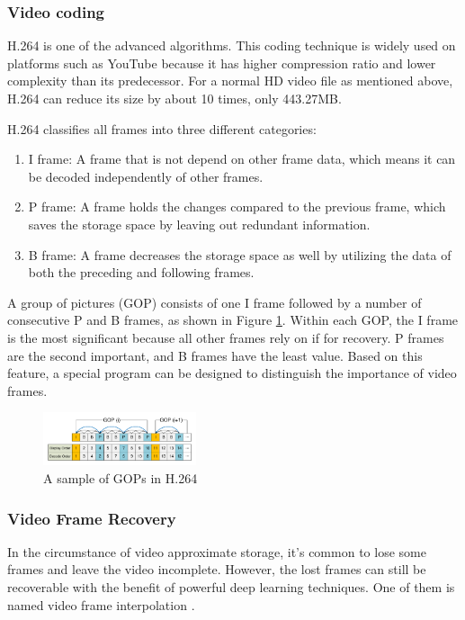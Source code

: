 \documentclass[sigconf]{acmart}
\begin{document}
\subsubsection{Video coding}
H.264 \cite{wiegand2003overview} is one of the advanced algorithms. This coding technique is widely used on platforms such as YouTube because it has higher compression ratio and lower complexity than its predecessor. For a normal HD video file as mentioned above, H.264 can reduce its size by about 10 times, only 443.27MB.

H.264 classifies all frames into three different categories:
\begin{enumerate}
    \item I frame: A frame that is not depend on other frame data, which means it can be decoded independently of other frames.
    \item P frame: A frame holds the changes compared to the previous frame, which saves the storage space by leaving out redundant information.
    \item B frame: A frame decreases the storage space as well by utilizing the data of both the preceding and following frames.
\end{enumerate}
A group of pictures (GOP) consists of one I frame followed by a number of consecutive P and B frames, as shown in Figure \ref{H264-IPB}.
Within each GOP, the I frame is the most significant because all other frames rely on if for recovery. P frames are the second important, and B frames have the least value.
Based on this feature, a special program can be designed to distinguish the importance of video frames.

\begin{figure}[ht]
\centering
\includegraphics[width=0.4\textwidth]{photo/H264_IPB.pdf}
\vspace{-3mm}
\caption{A sample of GOPs in H.264}
\vspace{-3mm}
\label{H264-IPB}
\end{figure}

\subsubsection{Video Frame Recovery}
In the circumstance of video approximate storage, it's common to lose some frames and leave the video incomplete. However, the lost frames can still be recoverable with the benefit of powerful deep learning techniques. One of them is named video frame interpolation \cite{meyer2015phase, niklaus2018context, van2017frame}.
\end{document}
